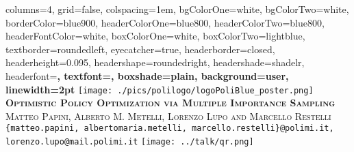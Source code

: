 \documentclass[landscape,a0paper,fontscale=0.35]{baposter}
\begin{document}
\begin{poster}%
  {
  columns=4,
  grid=false,
  colspacing=1em,
  bgColorOne=white,
  bgColorTwo=white,
  borderColor=blue900,
  headerColorOne=blue800,
  headerColorTwo=blue800,
  headerFontColor=white,
  boxColorOne=white,
  boxColorTwo=lightblue,
  textborder=roundedleft,
  eyecatcher=true,
  headerborder=closed,
  headerheight=0.095\textheight,
  headershape=roundedright,
  headershade=shadelr,
  headerfont=\large\bf\textsc, %
  textfont={\setlength{\parindent}{1.5em}},
  boxshade=plain,
  background=user,
  linewidth=2pt
  }
  {\hspace{0.5cm} \texttt{[image: ./pics/polilogo/logoPoliBlue\_poster.png]} \hspace{2cm}}
  {\bf\textsc{Optimistic Policy Optimization via Multiple Importance Sampling}\vspace{0.1em}}
  {\textsc{Matteo Papini, Alberto M. Metelli, Lorenzo Lupo and Marcello Restelli}\\ 
  {\normalsize \texttt{\{matteo.papini, albertomaria.metelli, marcello.restelli\}@polimi.it, lorenzo.lupo@mail.polimi.it}}
  }
  {%
    {\texttt{[image: ../talk/qr.png]}}
  }



\end{poster}
\end{document}
